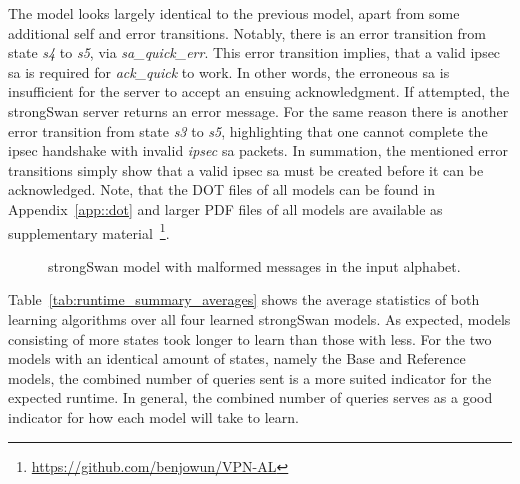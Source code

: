 The model looks largely identical to the previous model, apart from some additional self and error transitions. Notably, there is an error transition from state \emph{s4} to \emph{s5}, via \emph{sa\_quick\_err}. This error transition implies, that a valid \ac{ipsec} \ac{sa} is required for \emph{ack\_quick} to work. In other words, the erroneous \ac{sa} is insufficient for the server to accept an ensuing acknowledgment. If attempted, the strongSwan server returns an error message. For the same reason there is another error transition from state \emph{s3} to \emph{s5}, highlighting that one cannot complete the \ac{ipsec} handshake with invalid \emph{ipsec} \ac{sa} packets. In summation, the mentioned error transitions simply show that a valid \ac{ipsec} \ac{sa} must be created before it can be acknowledged. Note, that the DOT files of all models can be found in Appendix~\ref{app::dot} and larger PDF files of all models are available as supplementary material~\footnote{\url{https://github.com/benjowun/VPN-AL}}.

\begin{figure}[ht]
	\vspace*{\fill}
	\noindent
	\hspace*{-4.5\oddsidemargin}%
	\caption{strongSwan model with malformed messages in the input alphabet.}
	\label{fig:withfilterwitherrors}
	\vspace*{\fill}
\end{figure}

Table~\ref{tab:runtime_summary_averages} shows the average statistics of both learning algorithms over all four learned strongSwan models. As expected, models consisting of more states took longer to learn than those with less. For the two models with an identical amount of states, namely the Base and Reference models, the combined number of queries sent is a more suited indicator for the expected runtime. In general, the combined number of queries serves as a good indicator for how each model will take to learn. 

